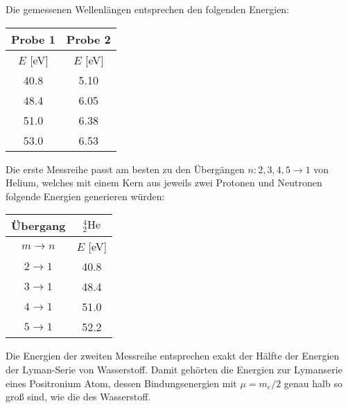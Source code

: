 \documentclass[ex,minted]{exercise_4.0}
\begin{document}
\dottedlinett

Die gemessenen Wellenlängen entsprechen den folgenden Energien:

\begin{center}
\begin{tabular}{|c|c|}
    \hline
    Probe 1 & Probe 2\\\hline
    \(E\) [eV] &\(E\) [eV] \\\hline
    40.8 & 5.10\\\hline
    48.4 & 6.05\\\hline
    51.0 & 6.38\\\hline
    53.0 & 6.53\\\hline
\end{tabular} 
\end{center}

Die erste Messreihe passt am besten zu den Übergängen \(n:2,3,4,5\to1\) von Helium, welches mit einem Kern aus jeweils zwei Protonen und Neutronen folgende Energien generieren würden:

\begin{center}
\begin{tabular}{|c|c|}
    \hline
    Übergang&${}_2^4\mathrm{He}$\\\hline
    $m\to n$&\(E\) [eV] \\\hline
    $2\to 1$ &40.8\\\hline
    $3\to 1$&48.4\\\hline
    $4\to 1$&51.0\\\hline
    $5\to 1$&52.2\\\hline
\end{tabular} 
\end{center}

Die Energien der zweiten Messreihe entsprechen exakt der Hälfte der Energien der Lyman-Serie von Wasserstoff. Damit gehörten die Energien zur Lymanserie eines Positronium Atom, dessen Bindungsenergien mit \(\mu = m_e/2\) genau halb so groß sind, wie die des Wasserstoff. 
\end{document}
